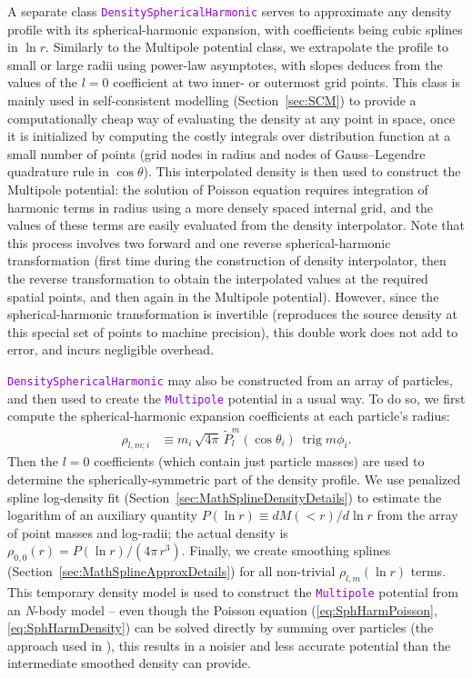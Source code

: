 \documentclass[12pt]{article}
\newcommand{\Nbody}{\textsl{N}-body\xspace}
\newcommand{\ttt}[1]{\textcolor{darkviolet}{\texttt{#1}}}
\DeclareMathOperator{\trig}{trig}
\begin{document}
A separate class \ttt{DensitySphericalHarmonic} serves to approximate any density profile with its spherical-harmonic expansion, with coefficients being cubic splines in $\ln r$. 
Similarly to the Multipole potential class, we extrapolate the profile to small or large radii using power-law asymptotes, with slopes deduces from the values of the $l=0$ coefficient at two inner- or outermost grid points. This class is mainly used in self-consistent modelling (Section~\ref{sec:SCM}) to provide a computationally cheap way of evaluating the density at any point in space, once it is initialized by computing the costly integrals over distribution function at a small number of points (grid nodes in radius and nodes of Gauss--Legendre quadrature rule in $\cos\theta$). This interpolated density is then used to construct the Multipole potential: the solution of Poisson equation requires integration of harmonic terms in radius using a more densely spaced internal grid, and the values of these terms are easily evaluated from the density interpolator. Note that this process involves two forward and one reverse spherical-harmonic transformation (first time during the construction of density interpolator, then the reverse transformation to obtain the interpolated values at the required spatial points, and then again in the Multipole potential). However, since the spherical-harmonic transformation is invertible (reproduces the source density at this special set of points to machine precision), this double work does not add to error, and incurs negligible overhead.

\ttt{DensitySphericalHarmonic} may also be constructed from an array of particles, and then used to create the \ttt{Multipole} potential in a usual way. To do so, we first compute the spherical-harmonic expansion coefficients at each particle's radius:
\begin{align*}
\rho_{l,m;i} &\equiv m_i\,\sqrt{4\pi}\,\tilde P_l^m(\cos\theta_i)\,\trig m\phi_i .
\end{align*}
Then the $l=0$ coefficients (which contain just particle masses) are used to determine the spherically-symmetric part of the density profile. We use penalized spline log-density fit (Section~\ref{sec:MathSplineDensityDetails}) to estimate the logarithm of an auxiliary quantity $P(\ln r) \equiv dM(<r)/d\ln r$ from the array of point masses and log-radii; the actual density is $\rho_{0,0}(r) = P(\ln r) / (4\pi\,r^3)$. Finally, we create smoothing splines (Section~\ref{sec:MathSplineApproxDetails}) for all non-trivial $\rho_{l,m}(\ln r)$ terms.
This temporary density model is used to construct the \ttt{Multipole} potential from an \Nbody model -- even though the Poisson equation (\ref{eq:SphHarmPoisson},\ref{eq:SphHarmDensity}) can be solved directly by summing over particles (the approach used in \cite{Vasiliev2013}), this results in a noisier and less accurate potential than the intermediate smoothed density can provide.
\end{document}
